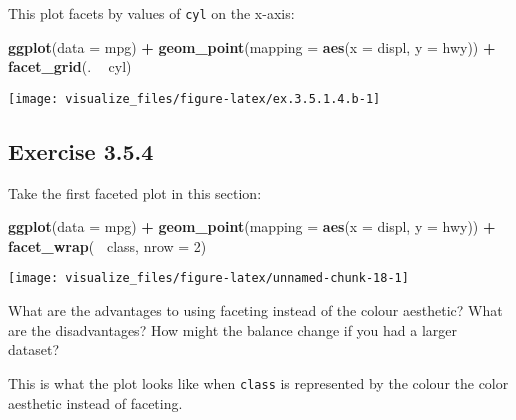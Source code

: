 \documentclass[]{book}
\newenvironment{Shaded}{\begin{snugshade}}{\end{snugshade}}
\newcommand{\DataTypeTok}[1]{\textcolor[rgb]{0.13,0.29,0.53}{#1}}
\newcommand{\DecValTok}[1]{\textcolor[rgb]{0.00,0.00,0.81}{#1}}
\newcommand{\KeywordTok}[1]{\textcolor[rgb]{0.13,0.29,0.53}{\textbf{#1}}}
\newcommand{\NormalTok}[1]{#1}
\newcommand{\OperatorTok}[1]{\textcolor[rgb]{0.81,0.36,0.00}{\textbf{#1}}}
\newcommand{\StringTok}[1]{\textcolor[rgb]{0.31,0.60,0.02}{#1}}
\theoremstyle{plain}
\theoremstyle{remark}
\begin{document}
This plot facets by values of \texttt{cyl} on the x-axis:

\begin{Shaded}
\begin{Highlighting}[]
\KeywordTok{ggplot}\NormalTok{(}\DataTypeTok{data =}\NormalTok{ mpg) }\OperatorTok{+}
\StringTok{  }\KeywordTok{geom_point}\NormalTok{(}\DataTypeTok{mapping =} \KeywordTok{aes}\NormalTok{(}\DataTypeTok{x =}\NormalTok{ displ, }\DataTypeTok{y =}\NormalTok{ hwy)) }\OperatorTok{+}
\StringTok{  }\KeywordTok{facet_grid}\NormalTok{(. }\OperatorTok{~}\StringTok{ }\NormalTok{cyl)}
\end{Highlighting}
\end{Shaded}

\begin{center}\texttt{[image: visualize\_files/figure-latex/ex.3.5.1.4.b-1]} \end{center}

\hypertarget{exercise-3.5.4}{%
\subsection*{\texorpdfstring{Exercise
{3.5.4}}{Exercise 3.5.4}}\label{exercise-3.5.4}}

Take the first faceted plot in this section:

\begin{Shaded}
\begin{Highlighting}[]
\KeywordTok{ggplot}\NormalTok{(}\DataTypeTok{data =}\NormalTok{ mpg) }\OperatorTok{+}
\StringTok{  }\KeywordTok{geom_point}\NormalTok{(}\DataTypeTok{mapping =} \KeywordTok{aes}\NormalTok{(}\DataTypeTok{x =}\NormalTok{ displ, }\DataTypeTok{y =}\NormalTok{ hwy)) }\OperatorTok{+}
\StringTok{  }\KeywordTok{facet_wrap}\NormalTok{(}\OperatorTok{~}\StringTok{ }\NormalTok{class, }\DataTypeTok{nrow =} \DecValTok{2}\NormalTok{)}
\end{Highlighting}
\end{Shaded}

\begin{center}\texttt{[image: visualize\_files/figure-latex/unnamed-chunk-18-1]} \end{center}

What are the advantages to using faceting instead of the colour
aesthetic? What are the disadvantages? How might the balance change if
you had a larger dataset?

This is what the plot looks like when \texttt{class} is represented by
the colour the color aesthetic instead of faceting.
\end{document}
